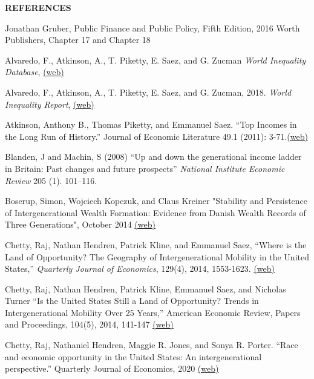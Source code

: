 \documentclass[landscape]{slides}
\begin{document}
\begin{slide}
\begin{center}
{\bf REFERENCES}
\end{center}
{\small

Jonathan Gruber, Public Finance and Public Policy, Fifth Edition, 2016 Worth Publishers, Chapter 17 and Chapter 18

Alvaredo, F., Atkinson, A., T. Piketty, E. Saez, and G. Zucman \emph{World Inequality Database},
\href{http://www.wid.world/} {(web)}

Alvaredo, F., Atkinson, A., T. Piketty, E. Saez, and G. Zucman, 2018. \emph{World Inequality Report},
\href{https://wir2018.wid.world/} {(web)}

Atkinson, Anthony B., Thomas Piketty, and Emmanuel Saez. ``Top Incomes in the Long Run of History.'' Journal of Economic Literature 49.1 (2011): 3-71.\href{http://elsa.berkeley.edu/~saez/atkinson-piketty-saezJEL10.pdf}{(web)}

Blanden, J and Machin, S (2008) ``Up and down the generational income ladder in Britain: Past changes and future prospects'' \emph{National Institute Economic Review} 205 (1). 101--116. 

Boserup,  Simon, Wojciech Kopczuk, and Claus Kreiner "Stability and Persistence of Intergenerational Wealth Formation: Evidence from Danish Wealth Records of Three Generations", October 2014
\href{http://elsa.berkeley.edu/~saez/course131/WealthAcrossGen.pdf}{(web)}

Chetty, Raj, Nathan Hendren, Patrick Kline, and Emmanuel Saez, ``Where is the Land of Opportunity? The Geography of Intergenerational Mobility in the United States,'' \emph{Quarterly Journal of Economics}, 129(4), 2014, 1553-1623.
\href{http://eml.berkeley.edu/~saez/chetty-friedman-kline-saezQJE14mobility.pdf}{(web)}

Chetty, Raj, Nathan Hendren, Patrick Kline, Emmanuel Saez,  and Nicholas Turner ``Is the United States Still a Land of Opportunity? Trends in Intergenerational Mobility Over 25 Years,'' American Economic Review, Papers and Proceedings, 104(5), 2014, 141-147 \href{https://eml.berkeley.edu/~saez/chettyetalAERPP2014.pdf}{(web)}

Chetty, Raj, Nathaniel Hendren, Maggie R. Jones, and Sonya R. Porter. ``Race and economic opportunity in the United States: An intergenerational perspective.'' Quarterly Journal of Economics, 2020  \href{https://opportunityinsights.org/wp-content/uploads/2018/04/race_paper.pdf}{(web)}

}
\end{slide}
\end{document}
